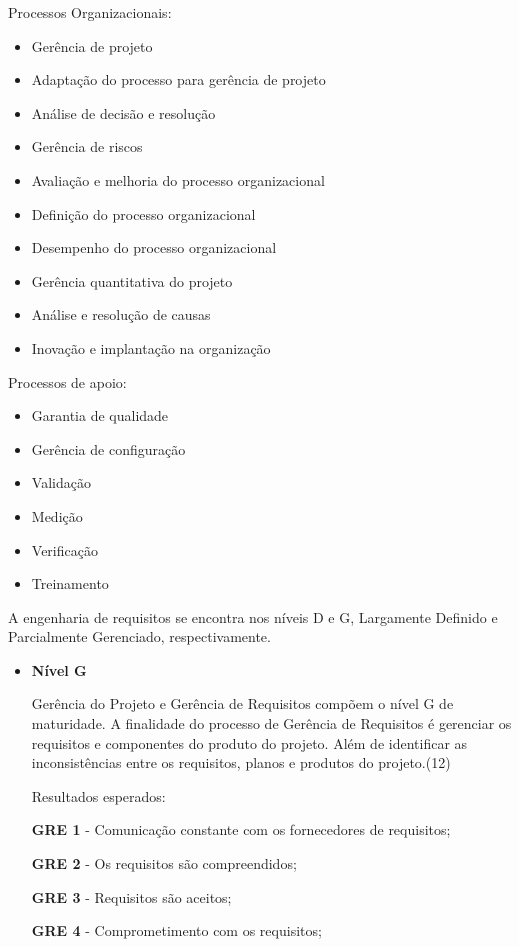 \begin{itemize}
Processos Organizacionais:

\begin{itemize}
\item Gerência de projeto
\item Adaptação do processo para gerência de projeto
\item Análise de decisão e resolução
\item Gerência de riscos
\item Avaliação e melhoria do processo organizacional
\item Definição do processo organizacional
\item Desempenho do processo organizacional
\item Gerência quantitativa do projeto
\item Análise e resolução de causas
\item Inovação e implantação na organização
\end{itemize}

Processos de apoio:

\begin{itemize}
\item Garantia de qualidade
\item Gerência de configuração
\item Validação
\item Medição
\item Verificação
\item Treinamento
\end{itemize}

A engenharia de requisitos se encontra nos níveis D e G, Largamente Definido e Parcialmente Gerenciado, respectivamente.

\begin{itemize}
\item\textbf{Nível G}

Gerência do Projeto e Gerência de Requisitos compõem o nível G de maturidade.
A finalidade do processo de Gerência de Requisitos é gerenciar os requisitos e componentes do produto do projeto. Além de identificar as inconsistências entre os requisitos, planos e produtos do projeto.(12)

Resultados esperados:

\textbf{GRE 1} - Comunicação constante com os fornecedores de requisitos;

\textbf{GRE 2} - Os requisitos são compreendidos;

\textbf{GRE 3} - Requisitos são aceitos;

\textbf{GRE 4} - Comprometimento com os requisitos;


\end{itemize}
\end{itemize}
